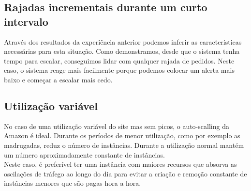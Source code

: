 \subsection{Rajadas incrementais durante um curto intervalo}
Através dos resultados da experiência anterior podemos inferir as características necessárias para esta situação. Como demonstramos, desde que o sistema tenha tempo para escalar, conseguimos lidar com qualquer rajada de pedidos. Neste caso, o sistema reage mais facilmente porque podemos colocar um alerta mais baixo e começar a escalar mais cedo.

\subsection{Utilização variável}
No caso de uma utilização variável do site mas sem picos, o auto-scalling da Amazon é ideal. Durante os períodos de menor utilização, como por exemplo as madrugadas, reduz o número de instâncias. Durante a utilização normal mantém um número aproximadamente constante de instâncias. \\
Neste caso, é preferível ter uma instância com maiores recursos que absorva as oscilações de tráfego ao longo do dia para evitar a criação e remoção constante de instâncias menores que são pagas hora a hora.\\




